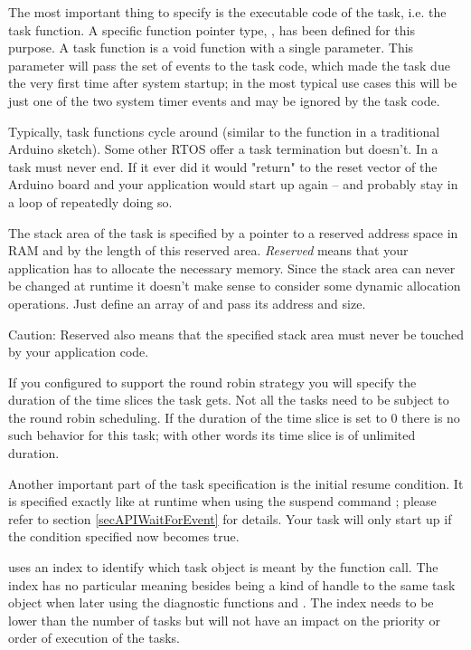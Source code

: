 The most important thing to specify is the executable code of the task,
i.e. the task function. A specific function pointer type,
, has been defined for this purpose. A
task function is a void function with a single parameter. This parameter
will pass the set of events to the task code, which made the task due the
very first time after system startup; in the most typical use cases this
will be just one of the two system timer events and may be ignored by the
task code.

Typically, task functions cycle around (similar to the function
 in a traditional Arduino sketch). Some other RTOS offer a
task termination but \rtos{} doesn't. In \rtos{} a task must never end. If
it ever did it would "return" to the reset vector of the Arduino board and
your application would start up again -- and probably stay in a loop of
repeatedly doing so.

The stack area of the task is specified by a pointer to a reserved address
space in RAM and by the length of this reserved area. \emph{Reserved} means
that your application has to allocate the necessary memory. Since the
stack area can never be changed at runtime it doesn't make sense to
consider some dynamic allocation operations. Just define an array of
 and pass its address and size.

Caution: Reserved also means that the specified stack area must never be
touched by your application code.

If you configured \rtos{} to support the round robin strategy you will
specify the duration of the time slices the task gets. Not all the tasks
need to be subject to the round robin scheduling. If the duration of the
time slice is set to 0 there is no such behavior for this task; with other
words its time slice is of unlimited duration.

Another important part of the task specification is the initial resume
condition. It is specified exactly like at runtime when using the suspend
command ; please refer to section
\ref{secAPIWaitForEvent} for details. Your task will only start up if the
condition specified now becomes true.

 uses an index to identify which task object is
meant by the function call. The index has no particular meaning besides
being a kind of handle to the same task object when later using the
diagnostic functions  and
. The index needs to be lower than the number
of tasks but will not have an impact on the priority or order of execution
of the tasks.


